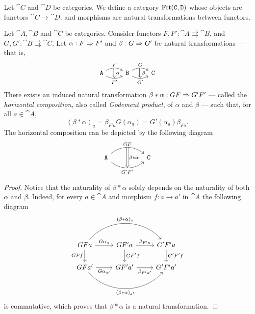 \begin{definition}
    \label{def:functor-category}
    Let \(\cat C\) and \(\cat D\) be categories. We define a category \(\operatorname{Fct}(\texttt C,
    \texttt D)\) whose objects are functors \(\cat C \to \cat D\), and morphisms are
    natural transformations between functors.
\end{definition}

\begin{proposition}
    \label{prop:horizontal-composition-natural-transformation}
    Let \(\cat A, \cat B\) and \(\cat C\) be categories. Consider functors \(F, F':
    \cat A \rightrightarrows \cat B\), and \(G, G': \cat B \rightrightarrows \cat
    C\).  Let \(\alpha: F \Rightarrow F'\) and \(\beta: G \Rightarrow G'\) be natural
    transformations --- that is,
    \[
        \begin{tikzcd}
            \cat A \ar[r, bend left, "F"{name=F}]
            \ar[r, bend right, "{F'}"'{name=FF}]
            &\cat B \ar[r, bend left, "G"{name=G}]
            \ar[r, bend right, "{G'}"'{name=GG}]
            & \cat C
            \ar[Rightarrow, from=F, to=FF, "\alpha"]
            \ar[Rightarrow, from=G, to=GG, "\beta"]
        \end{tikzcd}
    \]
    There exists an induced natural transformation
    \(\beta * \alpha: G F \Rightarrow G' F'\) --- called the \emph{horizontal composition},
    also called \emph{Godement product}, of \(\alpha\) and \(\beta\) --- such that,
    for all \(a \in \cat A\),
    \[
        (\beta * \alpha)_a = \beta_{F' a} G(\alpha_a) = G'(\alpha_a) \beta_{F a}.
    \]
    The horizontal composition can be depicted by the following diagram
    \[
        \begin{tikzcd}
            \cat A \ar[rr, bend left=40, "G F"{name=s}]
            \ar[rr, bend right=40, swap, "{G' F'}"{name=t}]
            &&\cat C
            \ar[Rightarrow, from=s, to=t, "\beta * \alpha"]
        \end{tikzcd}
    \]
\end{proposition}

\begin{proof}
    Notice that the naturality of \(\beta * \alpha\) solely depends on the
    naturality of both \(\alpha\) and \(\beta\). Indeed, for every \(a \in \cat A\)
    and morphism \(f: a \to a'\) in \(\cat A\) the following diagram
    \[
        \begin{tikzcd}
            G F a \ar[d, "G F f"'] \ar[r, "G \alpha_a"]
            \ar[rr, bend left=50, "{(\beta * \alpha)_{a}}"]
            &G F' a \ar[r, "\beta_{F' a}"] \ar[d, "G F' f"]
            & G' F' a \ar[d, "G' F' f"]
            \\
            G F a' \ar[r, "G \alpha_{a'}"']
            \ar[rr, bend right=50, "{(\beta * \alpha)_{a'}}"']
            &G F' a' \ar[r, "\beta_{F' a'}"']
            &G' F' a'
        \end{tikzcd}
    \]
    is commutative, which proves that \(\beta * \alpha\) is a natural
    transformation.
\end{proof}

